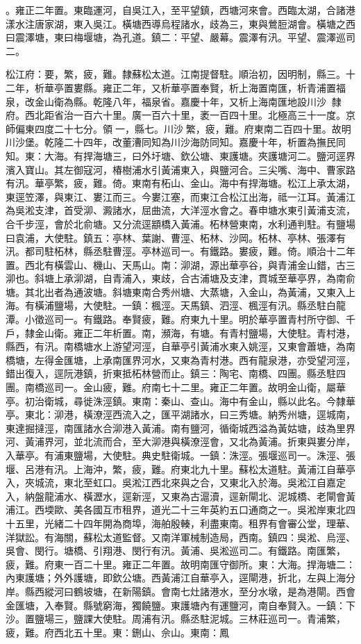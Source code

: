 \begin{pinyinscope}
。雍正二年置。東臨運河，自吳江入，至平望鎮，西塘河來會。西臨太湖，合諸港漾水注唐家湖，東入吳江。橫塘西導烏程諸水，歧為三，東與鶯脰湖會。橫塘之西曰震澤塘，東曰梅堰塘，為孔道。鎮二：平望、嚴幕。震澤有汛。平望、震澤巡司二。

松江府：要，繁，疲，難。隸蘇松太道。江南提督駐。順治初，因明制，縣三。十二年，析華亭置婁縣。雍正二年，又析華亭置奉賢，析上海置南匯，析青浦置福泉，改金山衛為縣。乾隆八年，福泉省。嘉慶十年，又析上海南匯地設川沙，隸府。西北距省治一百六十里。廣一百六十里，袤一百四十里。北極高三十一度。京師偏東四度二十七分。領一，縣七。川沙繁，疲，難。府東南二百四十里。故明川沙堡。乾隆二十四年，改董漕同知為川沙海防同知。嘉慶十年，析置為撫民同知。東：大海。有捍海塘三，曰外圩塘、欽公塘、東護塘。夾護塘河二。鹽河逕界濱入寶山。其左御寇河，椿樹浦水引黃浦東入，與鹽河合。三尖嘴、海中、曹家路有汛。華亭繁，疲，難。倚。東南有柘山、金山。海中有捍海塘。松江上承太湖，東逕笠澤，與東江、婁江而三。今婁江塞，而東江合松江出海，祗一江耳。黃浦江為吳淞支津，首受泖、澱諸水，屈曲流，大洋涇水會之。春申塘水東引黃浦支流，合千步涇，會於北俞塘。又分流逕顓橋入黃浦。柘林營東南，水利通判駐。有鹽場曰袁浦，大使駐。鎮五：亭林、葉謝、曹涇、柘林、沙岡。柘林、亭林、張澤有汛。都司駐柘林，縣丞駐曹涇。亭林巡司一。有鐵路。婁疲，難。倚。順治十二年置。西北有橫雲山、機山、天馬山。南：泖湖，源出華亭谷，與青浦金山錯，古三泖也。斜塘上承泖湖，自青浦入，東歧，合古浦塘及支津，貫城至華亭界，為南俞塘。其北出者為通波塘。斜塘東南合秀州塘、大蒸塘，入金山，為黃浦，又東入上海。有橫浦鹽場，大使駐。一鎮：楓涇。天馬鎮、泗涇、楓涇有汛。縣丞駐白龍潭。小徵巡司一。有鐵路。奉賢疲，難。府東九十里。明於華亭置青村所守御、千戶，隸金山衛。雍正二年析置。南，瀕海，有塘。有青村鹽場，大使駐。青村港，縣西，有汛。南橋塘水上游望河涇，自華亭引黃浦水東入姚涇，又東會蕭塘，為南橋塘，左得金匯塘，上承南匯界河水，又東為青村港。西有龍泉港，亦受望河涇，錯出復入，逕阮港鎮，折東抵柘林營而止。鎮三：陶宅、南橋、四團。縣丞駐四團。南橋巡司一。金山疲，難。府南七十二里。雍正二年置。故明金山衛，屬華亭。初治衛城，尋徙洙涇鎮。東南：秦山、查山。海中有金山，縣以此名。今隸華亭。東北：泖港，橫潦涇西流入之，匯平湖諸水，曰三秀塘。納秀州塘，逕城南，東達掘撻涇，南匯諸水合泖港入黃浦。南有鹽河，循衛城西溢為黃姑塘，歧為里界河、黃浦界河，並北流而合，至大泖港與橫潦涇會，又北為黃浦。折東與婁分岸，入華亭。有浦東鹽場，大使駐。典史駐衛城。一鎮：洙涇。張堰巡司一。洙涇、張堰、呂港有汛。上海沖，繁，疲，難。府東北九十里。蘇松太道駐。黃浦江自華亭入，夾城流，東北至虹口。吳淞江西北來與之合，又東北入於海。吳淞江自嘉定入，納盤龍浦水、橫瀝水，逕新涇，又東為古滬瀆，逕新閘北、泥城橋、老閘會黃浦江。西堧歐、美各國互市租界，道光二十三年英約五口通商之一。吳淞岸東北四十五里，光緒二十四年開為商埠，海舶殷輳，利盡東南。租界有會審公堂，理華、洋獄訟。有海關，蘇松太道監督。又南洋軍械制造局，西南。鎮四：吳淞、烏涇、吳會、閔行。塘橋、引翔港、閔行有汛。黃浦、吳淞巡司二。有鐵路。南匯繁，疲，難。府東一百二十里。雍正二年置。故明南匯守御所。東：大海。捍海塘二：內東護塘；外外護塘，即欽公塘。西黃浦江自華亭入，逕閘港，折北，左與上海分岸。縣西縱河曰鶴坡塘，在新陽鎮。會南七灶諸港水，至分水墩，是為港閘。西會金匯塘，入奉賢。縣號窮海，獨饒鹽。東護塘內有運鹽河，南自奉賢入。一鎮：下沙。置鹽場三，鹽課大使駐。周浦有汛。縣丞駐泥城。三林莊巡司一。青浦繁，疲，難。府西北五十里。東：鉶山、佘山。東南：鳳
\end{pinyinscope}
